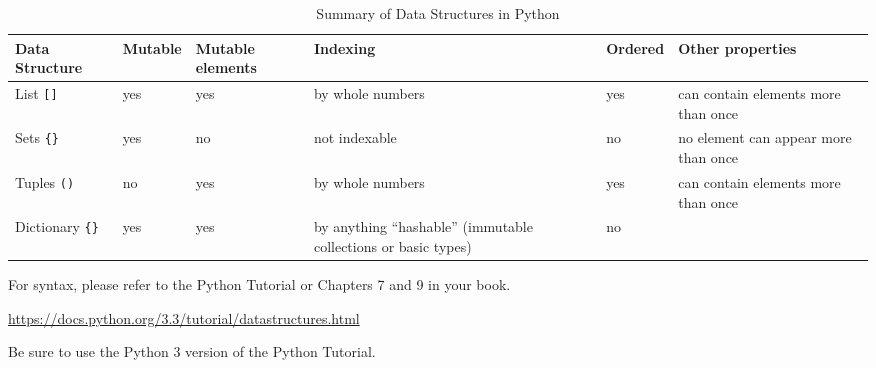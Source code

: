 \documentclass[11pt]{cselabheader}
\begin{document}
\begin{table}[!ht]
  \centering
  \begin{tabular}{p{1.6cm}lp{1.6cm}p{3.5cm}lp{4.5cm}}
    \toprule
    Data Structure & Mutable & Mutable elements & Indexing & Ordered
    & Other
    properties\\
    \midrule
    List \lstinline![]! & yes & yes & by whole numbers & yes & can contain elements more than once\\
    Sets \lstinline!{}! & yes & no & not indexable & no & no element can appear more than once\\
    Tuples \lstinline!()! & no & yes & by whole numbers & yes & can contain elements more than
    once\\
    Dictionary \lstinline!{}! & yes & yes & by anything ``hashable'' (immutable collections or
    basic types) & no & \\
    \bottomrule
  \end{tabular}
  \caption{Summary of Data Structures in Python}
  \label{tab:sum}
\end{table}

For syntax, please refer to the Python Tutorial or Chapters 7 and 9 in your
book.
\begin{center}
  \url{https://docs.python.org/3.3/tutorial/datastructures.html}
\end{center}
Be sure to use the Python 3 version of the Python Tutorial.
\end{document}
